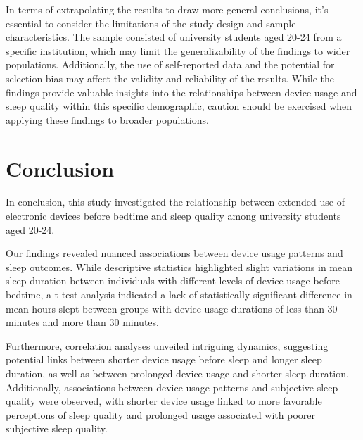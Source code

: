 \documentclass[11pt]{article}
\begin{document}
In terms of extrapolating the results to draw more general conclusions,
it's essential to consider the limitations of the study design and
sample characteristics. The sample consisted of university students aged
20-24 from a specific institution, which may limit the generalizability
of the findings to wider populations. Additionally, the use of
self-reported data and the potential for selection bias may affect the
validity and reliability of the results. While the findings provide
valuable insights into the relationships between device usage and sleep
quality within this specific demographic, caution should be exercised
when applying these findings to broader populations.

    \hypertarget{conclusion}{%
\section{Conclusion}\label{conclusion}}

In conclusion, this study investigated the relationship between extended
use of electronic devices before bedtime and sleep quality among
university students aged 20-24.

Our findings revealed nuanced associations between device usage patterns
and sleep outcomes. While descriptive statistics highlighted slight
variations in mean sleep duration between individuals with different
levels of device usage before bedtime, a t-test analysis indicated a
lack of statistically significant difference in mean hours slept between
groups with device usage durations of less than 30 minutes and more than
30 minutes.

Furthermore, correlation analyses unveiled intriguing dynamics,
suggesting potential links between shorter device usage before sleep and
longer sleep duration, as well as between prolonged device usage and
shorter sleep duration. Additionally, associations between device usage
patterns and subjective sleep quality were observed, with shorter device
usage linked to more favorable perceptions of sleep quality and
prolonged usage associated with poorer subjective sleep quality.


    
    
    
\end{document}
